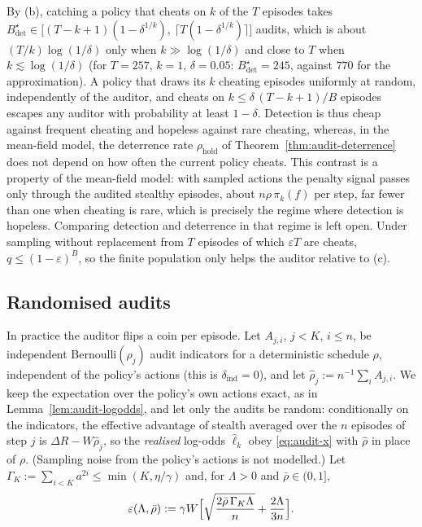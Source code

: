 \begin{remark}\label{rem:audit-detect-deter}
By (b), catching a policy that cheats on $k$ of the $T$ episodes takes
$B^\star_{\det}\in\bigl[(T-k+1)(1-\delta^{1/k}),\ \lceil T(1-\delta^{1/k})\rceil\bigr]$ audits, which is about $(T/k)\log(1/\delta)$ only when $k\gg\log(1/\delta)$ and close to $T$ when $k\lesssim\log(1/\delta)$ (for $T=257$, $k=1$, $\delta=0.05$: $B^\star_{\det}=245$, against $770$ for the approximation). A policy that draws its $k$ cheating episodes uniformly at random, independently of the auditor, and cheats on
$k\le\delta\,(T-k+1)/B$ episodes escapes any auditor with probability at least
$1-\delta$. Detection is thus cheap against frequent cheating and hopeless
against rare cheating, whereas, in the mean-field model, the deterrence rate $\rho_{\mathrm{hold}}$ of
Theorem~\ref{thm:audit-deterrence} does not depend on how often the current
policy cheats. This contrast is a property of the mean-field model: with sampled actions the penalty signal passes only through the audited stealthy episodes, about $n\rho\,\pi_k(f)$ per step, far fewer than one when cheating is rare, which is precisely the regime where detection is hopeless. Comparing detection and deterrence in that regime is left open. Under sampling without replacement from $T$ episodes of which
$\varepsilon T$ are cheats, $q\le(1-\varepsilon)^B$, so the finite population
only helps the auditor relative to (c).
\end{remark}

\subsection{Randomised audits}

In practice the auditor flips a coin per episode. Let $A_{j,i}$,
$j<K$, $i\le n$, be independent Bernoulli$(\rho_j)$ audit indicators for a
deterministic schedule $\rho$, independent of the policy's actions (this is
$\delta_{\mathrm{ind}}=0$), and let $\hat\rho_j:=n^{-1}\sum_iA_{j,i}$. We keep
the expectation over the policy's own actions exact, as in
Lemma~\ref{lem:audit-logodds}, and let only the audits be random: conditionally
on the indicators, the effective advantage of stealth averaged over the $n$
episodes of step $j$ is $\Delta R-W\hat\rho_j$, so the \emph{realised}
log-odds $\hat\ell_k$ obey \eqref{eq:audit-x} with $\hat\rho$ in place of $\rho$.
(Sampling noise from the policy's actions is not modelled.) Let
$\Gamma_K:=\sum_{i<K}a^{2i}\le\min(K,\eta/\gamma)$ and, for $\Lambda>0$ and
$\bar\rho\in(0,1]$,
\[
  \varepsilon(\Lambda,\bar\rho):=\gamma W\Bigl[\sqrt{\frac{2\bar\rho\,\Gamma_K\Lambda}{n}}
  +\frac{2\Lambda}{3n}\Bigr].
\]

